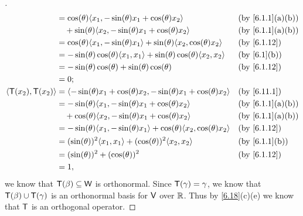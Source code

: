 \begin{proof}[]
\begin{align*}
                           & = \cos(\theta) \inn{x_1, -\sin(\theta) x_1 + \cos(\theta) x_2}                          &  & \by{6.1.1}[a,b] \\
                           & \quad + \sin(\theta) \inn{x_2, -\sin(\theta) x_1 + \cos(\theta) x_2}                    &  & \by{6.1.1}[a,b] \\
                           & = \cos(\theta) \inn{x_1, -\sin(\theta) x_1} + \sin(\theta) \inn{x_2, \cos(\theta) x_2}  &  & \by{6.1.12}     \\
                           & = -\sin(\theta) \cos(\theta) \inn{x_1, x_1} + \sin(\theta) \cos(\theta) \inn{x_2, x_2}  &  & \by{6.1}[b]     \\
                           & = -\sin(\theta) \cos(\theta) + \sin(\theta) \cos(\theta)                                &  & \by{6.1.12}     \\
                           & = 0;                                                                                                         \\
    \inn{\T(x_2), \T(x_2)} & = \inn{-\sin(\theta) x_1 + \cos(\theta) x_2, -\sin(\theta) x_1 + \cos(\theta) x_2}      &  & \by{6.11.1}     \\
                           & = -\sin(\theta) \inn{x_1, -\sin(\theta) x_1 + \cos(\theta) x_2}                         &  & \by{6.1.1}[a,b] \\
                           & \quad + \cos(\theta) \inn{x_2, -\sin(\theta) x_1 + \cos(\theta) x_2}                    &  & \by{6.1.1}[a,b] \\
                           & = -\sin(\theta) \inn{x_1, -\sin(\theta) x_1} + \cos(\theta) \inn{x_2, \cos(\theta) x_2} &  & \by{6.1.12}     \\
                           & = (\sin(\theta))^2 \inn{x_1, x_1} + (\cos(\theta))^2 \inn{x_2, x_2}                     &  & \by{6.1.1}[b]   \\
                           & = (\sin(\theta))^2 + (\cos(\theta))^2                                                   &  & \by{6.1.12}     \\
                           & = 1,
  \end{align*}
  we know that \(\mathsf{T}(\beta) \subseteq \mathsf{W}\) is orthonormal.
  Since \(\mathsf{T}(\gamma) = \gamma\), we know that \(\mathsf{T}(\beta) \cup \mathsf{T}(\gamma)\) is an orthonormal basis for \(\mathsf{V}\) over \(\mathbb{R}\).
  Thus by \cref{6.18}(c)(e) we know that \(\mathsf{T}\) is an orthogonal operator.


\end{proof}
